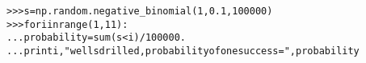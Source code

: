 \begin{boxedminipage}{\funcwidth}
\begin{alltt}
{\textgreater}{\textgreater}{\textgreater} s = np.random.negative\_binomial(1, 0.1, 100000)
{\textgreater}{\textgreater}{\textgreater} for i in range(1, 11):
...    probability = sum(s{\textless}i) / 100000.
...    print i, "wells drilled, probability of one success =", probability
\end{alltt}

\setlength{\parskip}{1ex}
    \end{boxedminipage}

    \label{trunk:qstkutil:bollinger:noncentral_chisquare}

    \vspace{0.5ex}

